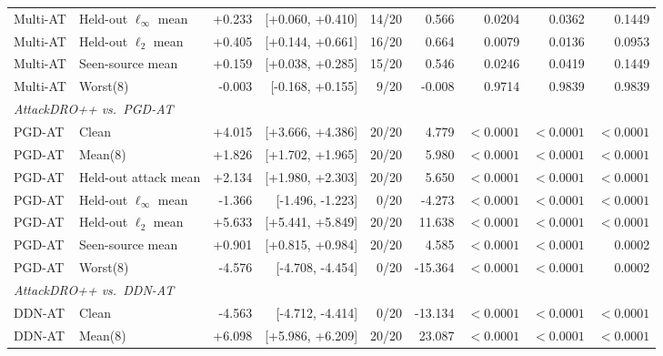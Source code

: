 \begin{table}[H]
{\begin{tabular}{llrrrrrrr}
 Multi-AT & Held-out $\ell_\infty$ mean
& +0.233 & [+0.060, +0.410] & 14/20 & 0.566 & 0.0204 & 0.0362 & 0.1449 \\

 Multi-AT & Held-out $\ell_2$ mean
& +0.405 & [+0.144, +0.661] & 16/20 & 0.664 & 0.0079 & 0.0136 & 0.0953 \\

 Multi-AT & Seen-source mean
& +0.159 & [+0.038, +0.285] & 15/20 & 0.546 & 0.0246 & 0.0419 & 0.1449 \\

 Multi-AT & Worst(8)
& -0.003 & [-0.168, +0.155] & 9/20 & -0.008 & 0.9714 & 0.9839 & 0.9839 \\

\midrule
\multicolumn{9}{l}{\textit{AttackDRO++ vs.\ PGD-AT}} \\
\midrule
PGD-AT & Clean
& +4.015 & [+3.666, +4.386] & 20/20 & 4.779 & $<0.0001$ & $<0.0001$ & $<0.0001$ \\

PGD-AT & Mean(8)
& +1.826 & [+1.702, +1.965] & 20/20 & 5.980 & $<0.0001$ & $<0.0001$ & $<0.0001$ \\

PGD-AT & Held-out attack mean
& +2.134 & [+1.980, +2.303] & 20/20 & 5.650 & $<0.0001$ & $<0.0001$ & $<0.0001$ \\

PGD-AT & Held-out $\ell_\infty$ mean
& -1.366 & [-1.496, -1.223] & 0/20 & -4.273 & $<0.0001$ & $<0.0001$ & $<0.0001$ \\

PGD-AT & Held-out $\ell_2$ mean
& +5.633 & [+5.441, +5.849] & 20/20 & 11.638 & $<0.0001$ & $<0.0001$ & $<0.0001$ \\

PGD-AT & Seen-source mean
& +0.901 & [+0.815, +0.984] & 20/20 & 4.585 & $<0.0001$ & $<0.0001$ & 0.0002 \\

PGD-AT & Worst(8)
& -4.576 & [-4.708, -4.454] & 0/20 & -15.364 & $<0.0001$ & $<0.0001$ & 0.0002 \\

\midrule
\multicolumn{9}{l}{\textit{AttackDRO++ vs.\ DDN-AT}} \\
\midrule
DDN-AT & Clean
& -4.563 & [-4.712, -4.414] & 0/20 & -13.134 & $<0.0001$ & $<0.0001$ & $<0.0001$ \\

DDN-AT & Mean(8)
& +6.098 & [+5.986, +6.209] & 20/20 & 23.087 & $<0.0001$ & $<0.0001$ & $<0.0001$ \\


\end{tabular}}
\end{table}
